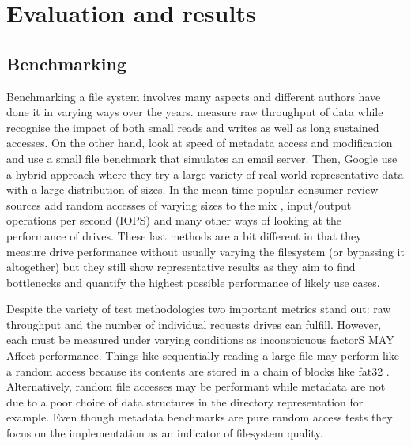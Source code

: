 \chapter{Evaluation and results}

    \section{Benchmarking}
        \label{sec:benchmark}

        Benchmarking a file system involves many aspects and different authors
        have done it in varying ways over the years.  measure
        raw throughput of data while  recognise the impact of both small
        reads and writes as well as long sustained accesses.  On the other
        hand,  look at speed of metadata access and
        modification and  use a small file
        benchmark that simulates an email server. Then, Google \cite{GFS} use a hybrid
        approach where they try a large variety of real world representative
        data with a large distribution of sizes. In the mean time popular
        consumer review sources add random accesses of varying sizes to the mix
        \cite{servethehome_review}, input/output operations per second (IOPS)
        \cite{tomshardware_review} and many other ways of looking at
        the performance of drives. These last methods are a bit different in that
        they measure drive performance without usually varying the filesystem
        (or bypassing it altogether) but they still show representative
        results as they aim to find bottlenecks and quantify the
        highest possible performance of likely use cases.

        Despite the variety of test methodologies two important metrics stand
        out: raw throughput and the number of individual requests drives can
        fulfill. However, each must be measured under varying conditions as
        inconspicuous factorS MAY Affect performance. Things like sequentially
        reading a large file may perform like a random access because its
        contents are stored in a chain of blocks like fat32 \cite{fat32}.
        Alternatively, random file accesses may be performant while metadata
        are not due to a poor choice of data structures in the directory
        representation for example. Even though metadata benchmarks are pure
        random access tests they focus on the implementation as an
        indicator of filesystem quality.


